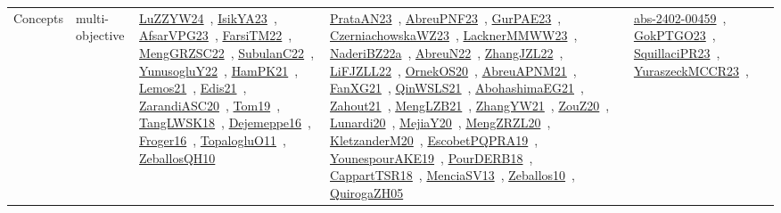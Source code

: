 {\begin{longtable}{lp{3cm}>{\raggedright\arraybackslash}p{6cm}>{\raggedright\arraybackslash}p{6cm}>{\raggedright\arraybackslash}p{8cm}}
Concepts & multi-objective & \href{../works/LuZZYW24.pdf}{LuZZYW24}~\cite{LuZZYW24}, \href{../works/IsikYA23.pdf}{IsikYA23}~\cite{IsikYA23}, \href{../works/AfsarVPG23.pdf}{AfsarVPG23}~\cite{AfsarVPG23}, \href{../works/FarsiTM22.pdf}{FarsiTM22}~\cite{FarsiTM22}, \href{../works/MengGRZSC22.pdf}{MengGRZSC22}~\cite{MengGRZSC22}, \href{../works/SubulanC22.pdf}{SubulanC22}~\cite{SubulanC22}, \href{../works/YunusogluY22.pdf}{YunusogluY22}~\cite{YunusogluY22}, \href{../works/HamPK21.pdf}{HamPK21}~\cite{HamPK21}, \href{../works/Lemos21.pdf}{Lemos21}~\cite{Lemos21}, \href{../works/Edis21.pdf}{Edis21}~\cite{Edis21}, \href{../works/ZarandiASC20.pdf}{ZarandiASC20}~\cite{ZarandiASC20}, \href{../works/Tom19.pdf}{Tom19}~\cite{Tom19}, \href{../works/TangLWSK18.pdf}{TangLWSK18}~\cite{TangLWSK18}, \href{../works/Dejemeppe16.pdf}{Dejemeppe16}~\cite{Dejemeppe16}, \href{../works/Froger16.pdf}{Froger16}~\cite{Froger16}, \href{../works/TopalogluO11.pdf}{TopalogluO11}~\cite{TopalogluO11}, \href{../works/ZeballosQH10.pdf}{ZeballosQH10}~\cite{ZeballosQH10} & \href{../works/PrataAN23.pdf}{PrataAN23}~\cite{PrataAN23}, \href{../works/AbreuPNF23.pdf}{AbreuPNF23}~\cite{AbreuPNF23}, \href{../works/GurPAE23.pdf}{GurPAE23}~\cite{GurPAE23}, \href{../works/CzerniachowskaWZ23.pdf}{CzerniachowskaWZ23}~\cite{CzerniachowskaWZ23}, \href{../works/LacknerMMWW23.pdf}{LacknerMMWW23}~\cite{LacknerMMWW23}, \href{../works/NaderiBZ22a.pdf}{NaderiBZ22a}~\cite{NaderiBZ22a}, \href{../works/AbreuN22.pdf}{AbreuN22}~\cite{AbreuN22}, \href{../works/ZhangJZL22.pdf}{ZhangJZL22}~\cite{ZhangJZL22}, \href{../works/LiFJZLL22.pdf}{LiFJZLL22}~\cite{LiFJZLL22}, \href{../works/OrnekOS20.pdf}{OrnekOS20}~\cite{OrnekOS20}, \href{../works/AbreuAPNM21.pdf}{AbreuAPNM21}~\cite{AbreuAPNM21}, \href{../works/FanXG21.pdf}{FanXG21}~\cite{FanXG21}, \href{../works/QinWSLS21.pdf}{QinWSLS21}~\cite{QinWSLS21}, \href{../works/AbohashimaEG21.pdf}{AbohashimaEG21}~\cite{AbohashimaEG21}, \href{../works/Zahout21.pdf}{Zahout21}~\cite{Zahout21}, \href{../works/MengLZB21.pdf}{MengLZB21}~\cite{MengLZB21}, \href{../works/ZhangYW21.pdf}{ZhangYW21}~\cite{ZhangYW21}, \href{../works/ZouZ20.pdf}{ZouZ20}~\cite{ZouZ20}, \href{../works/Lunardi20.pdf}{Lunardi20}~\cite{Lunardi20}, \href{../works/MejiaY20.pdf}{MejiaY20}~\cite{MejiaY20}, \href{../works/MengZRZL20.pdf}{MengZRZL20}~\cite{MengZRZL20}, \href{../works/KletzanderM20.pdf}{KletzanderM20}~\cite{KletzanderM20}, \href{../works/EscobetPQPRA19.pdf}{EscobetPQPRA19}~\cite{EscobetPQPRA19}, \href{../works/YounespourAKE19.pdf}{YounespourAKE19}~\cite{YounespourAKE19}, \href{../works/PourDERB18.pdf}{PourDERB18}~\cite{PourDERB18}, \href{../works/CappartTSR18.pdf}{CappartTSR18}~\cite{CappartTSR18}, \href{../works/MenciaSV13.pdf}{MenciaSV13}~\cite{MenciaSV13}, \href{../works/Zeballos10.pdf}{Zeballos10}~\cite{Zeballos10}, \href{../works/QuirogaZH05.pdf}{QuirogaZH05}~\cite{QuirogaZH05} & \href{../works/abs-2402-00459.pdf}{abs-2402-00459}~\cite{abs-2402-00459}, \href{../works/GokPTGO23.pdf}{GokPTGO23}~\cite{GokPTGO23}, \href{../works/SquillaciPR23.pdf}{SquillaciPR23}~\cite{SquillaciPR23}, \href{../works/YuraszeckMCCR23.pdf}{YuraszeckMCCR23}~\cite{YuraszeckMCCR23}, 
\end{longtable}}
